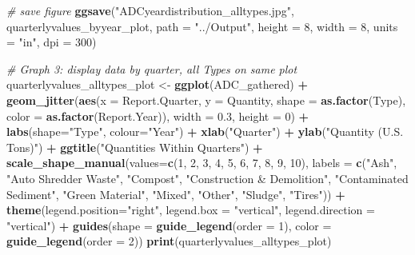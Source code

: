 \documentclass[12pt,]{article}
\newenvironment{Shaded}{\begin{snugshade}}{\end{snugshade}}
\newcommand{\KeywordTok}[1]{\textcolor[rgb]{0.13,0.29,0.53}{\textbf{#1}}}
\newcommand{\DataTypeTok}[1]{\textcolor[rgb]{0.13,0.29,0.53}{#1}}
\newcommand{\DecValTok}[1]{\textcolor[rgb]{0.00,0.00,0.81}{#1}}
\newcommand{\FloatTok}[1]{\textcolor[rgb]{0.00,0.00,0.81}{#1}}
\newcommand{\StringTok}[1]{\textcolor[rgb]{0.31,0.60,0.02}{#1}}
\newcommand{\CommentTok}[1]{\textcolor[rgb]{0.56,0.35,0.01}{\textit{#1}}}
\newcommand{\OperatorTok}[1]{\textcolor[rgb]{0.81,0.36,0.00}{\textbf{#1}}}
\newcommand{\NormalTok}[1]{#1}
\begin{document}
\begin{Shaded}
\begin{Highlighting}[]
\CommentTok{# save figure}
\KeywordTok{ggsave}\NormalTok{(}\StringTok{"ADCyeardistribution_alltypes.jpg"}\NormalTok{, quarterlyvalues_byyear_plot, }\DataTypeTok{path =} \StringTok{"../Output"}\NormalTok{, }\DataTypeTok{height =} \DecValTok{8}\NormalTok{, }\DataTypeTok{width =} \DecValTok{8}\NormalTok{, }\DataTypeTok{units =} \StringTok{"in"}\NormalTok{, }\DataTypeTok{dpi =} \DecValTok{300}\NormalTok{)}

\CommentTok{# Graph 3: display data by quarter, all Types on same plot}
\NormalTok{quarterlyvalues_alltypes_plot <-}\StringTok{ }
\StringTok{  }\KeywordTok{ggplot}\NormalTok{(ADC_gathered) }\OperatorTok{+}\StringTok{ }
\StringTok{  }\KeywordTok{geom_jitter}\NormalTok{(}\KeywordTok{aes}\NormalTok{(}\DataTypeTok{x =}\NormalTok{ Report.Quarter, }\DataTypeTok{y =}\NormalTok{ Quantity, }\DataTypeTok{shape =} \KeywordTok{as.factor}\NormalTok{(Type), }\DataTypeTok{color =} \KeywordTok{as.factor}\NormalTok{(Report.Year)), }\DataTypeTok{width =} \FloatTok{0.3}\NormalTok{, }\DataTypeTok{height =} \DecValTok{0}\NormalTok{) }\OperatorTok{+}\StringTok{ }
\StringTok{  }\KeywordTok{labs}\NormalTok{(}\DataTypeTok{shape=}\StringTok{"Type"}\NormalTok{, }\DataTypeTok{colour=}\StringTok{"Year"}\NormalTok{) }\OperatorTok{+}\StringTok{ }
\StringTok{  }\KeywordTok{xlab}\NormalTok{(}\StringTok{"Quarter"}\NormalTok{) }\OperatorTok{+}\StringTok{ }
\StringTok{  }\KeywordTok{ylab}\NormalTok{(}\StringTok{"Quantity (U.S. Tons)"}\NormalTok{) }\OperatorTok{+}\StringTok{ }
\StringTok{  }\KeywordTok{ggtitle}\NormalTok{(}\StringTok{"Quantities Within Quarters"}\NormalTok{) }\OperatorTok{+}\StringTok{ }
\StringTok{  }\KeywordTok{scale_shape_manual}\NormalTok{(}\DataTypeTok{values=}\KeywordTok{c}\NormalTok{(}\DecValTok{1}\NormalTok{, }\DecValTok{2}\NormalTok{, }\DecValTok{3}\NormalTok{, }\DecValTok{4}\NormalTok{, }\DecValTok{5}\NormalTok{, }\DecValTok{6}\NormalTok{, }\DecValTok{7}\NormalTok{, }\DecValTok{8}\NormalTok{, }\DecValTok{9}\NormalTok{, }\DecValTok{10}\NormalTok{), }\DataTypeTok{labels =} \KeywordTok{c}\NormalTok{(}\StringTok{"Ash"}\NormalTok{, }\StringTok{"Auto Shredder Waste"}\NormalTok{, }\StringTok{"Compost"}\NormalTok{, }\StringTok{"Construction & Demolition"}\NormalTok{, }\StringTok{"Contaminated Sediment"}\NormalTok{, }\StringTok{"Green Material"}\NormalTok{, }\StringTok{"Mixed"}\NormalTok{, }\StringTok{"Other"}\NormalTok{, }\StringTok{"Sludge"}\NormalTok{, }\StringTok{"Tires"}\NormalTok{)) }\OperatorTok{+}\StringTok{ }
\StringTok{  }\KeywordTok{theme}\NormalTok{(}\DataTypeTok{legend.position=}\StringTok{"right"}\NormalTok{, }\DataTypeTok{legend.box =} \StringTok{"vertical"}\NormalTok{, }\DataTypeTok{legend.direction =} \StringTok{"vertical"}\NormalTok{) }\OperatorTok{+}\StringTok{ }
\StringTok{  }\KeywordTok{guides}\NormalTok{(}\DataTypeTok{shape =} \KeywordTok{guide_legend}\NormalTok{(}\DataTypeTok{order =} \DecValTok{1}\NormalTok{), }\DataTypeTok{color =} \KeywordTok{guide_legend}\NormalTok{(}\DataTypeTok{order =} \DecValTok{2}\NormalTok{))}
\KeywordTok{print}\NormalTok{(quarterlyvalues_alltypes_plot)}
\end{Highlighting}
\end{Shaded}
\end{document}
